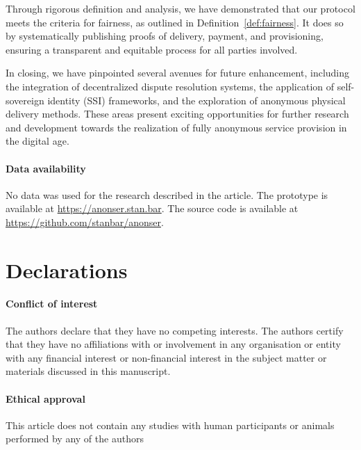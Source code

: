 \documentclass[pdftex,twocolumn,epjc3]{svjour3}
\begin{document}
\begin{sloppypar}
Through rigorous definition and analysis, we have demonstrated that our protocol meets the criteria for fairness, as outlined in Definition~\ref{def:fairness}. It does so by systematically publishing proofs of delivery, payment, and provisioning, ensuring a transparent and equitable process for all parties involved.
\end{sloppypar}

In closing, we have pinpointed several avenues for future enhancement, including the integration of decentralized dispute resolution systems, the application of self-sovereign identity (SSI) frameworks, and the exploration of anonymous physical delivery methods. These areas present exciting opportunities for further research and development towards the realization of fully anonymous service provision in the digital age.

\paragraph{Data availability}
No data was used for the research described in the article.
The prototype is available at \url{https://anonser.stan.bar}. 
The source code is available at \url{https://github.com/stanbar/anonser}.

\section*{Declarations}

\paragraph{Conflict of interest} The authors declare that they have no competing interests. The authors certify that they have no affiliations with or involvement in any organisation or entity with any financial interest or non-financial interest in the subject matter or materials discussed in this manuscript.

\paragraph{Ethical approval} This article does not contain any studies with human participants or animals performed by any of the authors


\appendix
\end{document}
